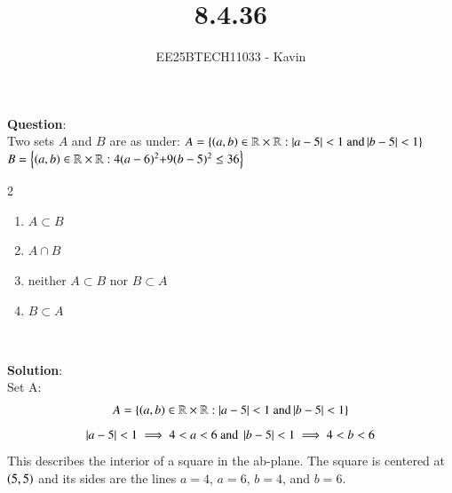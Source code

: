 \documentclass[journal]{IEEEtran}
\begin{document}

\vspace{3cm}

\title{8.4.36}
\author{EE25BTECH11033 - Kavin}
{\let\newpage\relax\maketitle}

\renewcommand{\thefigure}{\theenumi}
\renewcommand{\thetable}{\theenumi}
\setlength{\intextsep}{10pt} %
\textbf{Question}:\\
Two sets $A$ and $B$ are as under:
$A=\left\{\left(a,b\right)\in\mathbb{R}\times\mathbb{R}:\left\vert a-5\right\vert<1\text{ and} \left\vert b-5\right\vert<1\right\}$
$B=\left\{\left(a,b\right)\in\mathbb{R}\times\mathbb{R}:4(a-6)^2\text{+}9(b-5)^2\leq36\right\}$

			\begin{multicols}{2}
	\begin{enumerate}
		\item $A\subset B$ 
		\item $A\cap B$
		\item neither $A\subset B$ nor $B\subset A$
		\item $B\subset A$
	\end{enumerate}\end{multicols}\\    
\bigskip

\textbf{Solution}:\\
Set A:
\begin{align}
    A=\left\{\left(a,b\right)\in\mathbb{R}\times\mathbb{R}:\left\vert a-5\right\vert<1\text{ and} \left\vert b-5\right\vert<1\right\}
\end{align}
\begin{align}
    \left\vert a-5\right\vert<1\implies4<a<6 \text{ and } \left\vert b-5\right\vert<1\implies4<b<6
\end{align}
This describes the interior of a square in the ab-plane. The square is centered at $\left(5,5\right)$ and its sides are the lines $a=4$, $a=6$, $b=4$, and $b=6$.\\
\bigskip 
\end{document}
